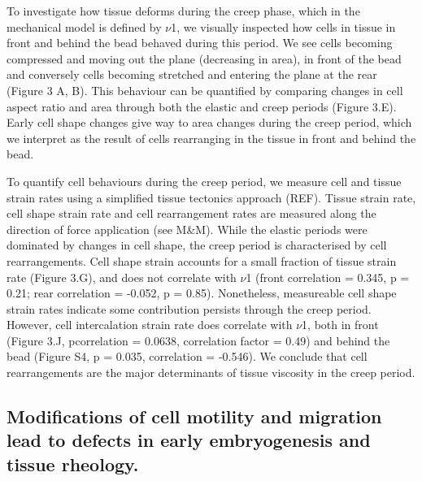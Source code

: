 To investigate how tissue deforms during the creep phase, which in the mechanical model is defined by $\nu$1, we visually inspected how cells in tissue in front and behind the bead behaved during this period.
We see cells becoming compressed and moving out the plane (decreasing in area), in front of the bead and conversely cells becoming stretched and entering the plane at the rear (Figure 3 A, B). This behaviour can be quantified by comparing changes in cell aspect ratio and area through both the elastic and creep periods (Figure 3.E).
Early cell shape changes give way to area changes during the creep period, which we interpret as the result of cells rearranging in the tissue in front and behind the bead.

To quantify cell behaviours during the creep period, we measure cell and tissue strain rates using a simplified tissue tectonics approach (REF).
Tissue strain rate, cell shape strain rate and cell rearrangement rates are measured along the direction of force application (see M\&M).
While the elastic periods were dominated by changes in cell shape, the creep period is characterised by cell rearrangements.
Cell shape strain accounts for a small fraction of tissue strain rate (Figure 3.G), and does not correlate with $\nu$1 (front correlation = 0.345, p = 0.21; rear correlation = -0.052, p = 0.85).
Nonetheless, measureable cell shape strain rates indicate some contribution persists through the creep period.
However, cell intercalation strain rate does correlate with $\nu$1, both in front (Figure 3.J, pcorrelation = 0.0638, correlation factor = 0.49) and behind the bead (Figure S4, p = 0.035, correlation = -0.546).
We conclude that cell rearrangements are the major determinants of tissue viscosity in the creep period.

\subsection{Modifications of cell motility and migration lead to defects in early embryogenesis and tissue rheology.}

